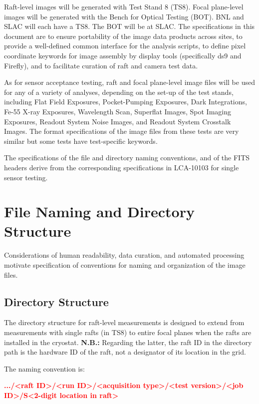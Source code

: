 \documentclass{article}[12pt]
\newcommand{\red}{\textcolor{red}}
\begin{document}
Raft-level images will be generated with Test Stand 8 (TS8).  Focal plane-level images will be generated with the Bench for Optical Testing (BOT).  BNL and SLAC will each have a TS8.  The BOT will be at SLAC.  The specifications in this document are to ensure portability of the image data products across sites, to provide a well-defined common interface for the analysis scripts, to define pixel coordinate keywords for image assembly by display tools (specifically ds9 and Firefly), and to facilitate curation of raft and camera test data.

As for sensor acceptance testing, raft and focal plane-level image files will be used for any of a variety of analyses, depending on the set-up of the test stands, including Flat Field Exposures, Pocket-Pumping Exposures, Dark Integrations, Fe-55 X-ray Exposures, Wavelength Scan, Superflat Images, Spot Imaging Exposures, Readout System Noise Images, and Readout System Crosstalk Images.
The format specifications of the image files from these tests are very similar but some tests have test-specific keywords.  

The specifications of the file and directory naming conventions, and of the FITS headers derive from the corresponding specifications in LCA-10103 for single sensor testing.

\section{File Naming and Directory Structure}
Considerations of human readability, data curation, and automated processing motivate specification of conventions for naming and organization of the image files.

\subsection{Directory Structure}

The directory structure for raft-level measurements is designed to extend from measurements with single rafts (in TS8) to entire focal planes when the rafts are installed in the cryostat.  {\bf N.B.:} Regarding the latter, the raft ID in the directory path is the hardware ID of the raft, not a designator of its location in the grid. 

The naming convention is:


\red{{\bf .../<raft ID>/<run ID>/<acquisition type>/<test version>/<job ID>/S<2-digit location in raft>}}
\end{document}
